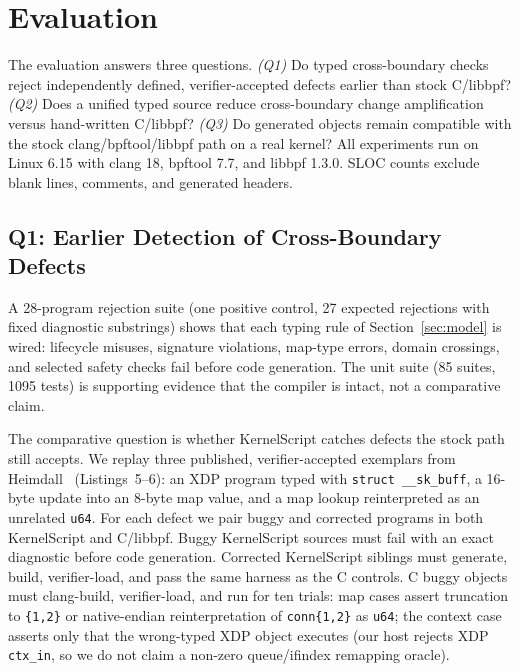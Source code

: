 \documentclass[sigplan,10pt,nonacm]{acmart}
\newcommand{\tool}{KernelScript}
\newcommand{\code}[1]{\texttt{\detokenize{#1}}}
\begin{document}
\section{Evaluation}
\label{sec:eval}

The evaluation answers three questions.
\emph{(Q1)} Do typed cross-boundary checks reject independently defined, verifier-accepted defects earlier than stock C/libbpf?
\emph{(Q2)} Does a unified typed source reduce cross-boundary change amplification versus hand-written C/libbpf?
\emph{(Q3)} Do generated objects remain compatible with the stock clang/bpftool/libbpf path on a real kernel?
All experiments run on Linux 6.15 with clang 18, bpftool 7.7, and libbpf 1.3.0. SLOC counts exclude blank lines, comments, and generated headers.

\subsection{Q1: Earlier Detection of Cross-Boundary Defects}

A 28-program rejection suite (one positive control, 27 expected rejections with fixed diagnostic substrings) shows that each typing rule of Section~\ref{sec:model} is wired: lifecycle misuses, signature violations, map-type errors, domain crossings, and selected safety checks fail before code generation. The unit suite (85 suites, 1095 tests) is supporting evidence that the compiler is intact, not a comparative claim.

The comparative question is whether \tool{} catches defects the stock path still accepts. We replay three published, verifier-accepted exemplars from Heimdall~\cite{heimdall} (Listings~5--6): an XDP program typed with \texttt{struct \_\_sk\_buff}, a 16-byte update into an 8-byte map value, and a map lookup reinterpreted as an unrelated \texttt{u64}. For each defect we pair buggy and corrected programs in both \tool{} and C/libbpf. Buggy \tool{} sources must fail with an exact diagnostic before code generation. Corrected \tool{} siblings must generate, build, verifier-load, and pass the same \code{BPF_PROG_TEST_RUN} harness as the C controls. C buggy objects must clang-build, verifier-load, and run for ten trials: map cases assert truncation to \texttt{\{1,2\}} or native-endian reinterpretation of \texttt{conn\{1,2\}} as \texttt{u64}; the context case asserts only that the wrong-typed XDP object executes (our host rejects XDP \texttt{ctx\_in}, so we do not claim a non-zero queue/ifindex remapping oracle).
\end{document}
